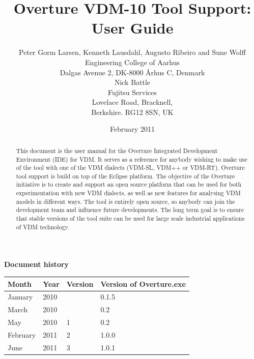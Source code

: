 \documentclass{overturerepchap}
\begin{document}
\title{Overture VDM-10 Tool Support: User Guide}
\author{Peter Gorm Larsen, Kenneth Lausdahl, Augusto Ribeiro and Sune Wolff \\ 
Engineering College of Aarhus\\
Dalgas Avenue 2, DK-8000 \AA{}rhus C, Denmark\\[3mm]
Nick Battle\\
Fujitsu Services\\
Lovelace Road, Bracknell, \\
Berkshire. RG12 8SN, UK}

\date{February 2011}


\maketitle


\textbf{Document history}

\begin{tabular}{|l|l|l|l|}\hline
Month   & Year & Version & Version of Overture.exe \\ \hline
January & 2010 &         & 0.1.5 \\ \hline
March   & 2010 &         & 0.2   \\ \hline
May     & 2010 & 1       & 0.2   \\ \hline
February& 2011 & 2       & 1.0.0   \\ \hline
June    & 2011 & 3       & 1.0.1   \\ \hline
\end{tabular}

\tableofcontents

\begin{abstract}
This document is the user manual for the Overture Integrated Development
Environment (IDE) for
VDM. It serves as a reference for anybody wishing to make use of
the tool with one of the VDM dialects (VDM-SL, VDM++ or VDM-RT).
Overture tool support is build on top of the Eclipse platform. The
objective of the Overture initiative is to create and support an open source
platform that can be used for both experimentation with new VDM dialects,
as well as new features for analysing VDM
models in different ways. The tool is entirely open source, so anybody
can join the development team and influence future
developments. The long term goal is to ensure that stable
versions of the tool suite can be used for large scale industrial
applications of VDM technology.
\end{abstract}
\end{document}
